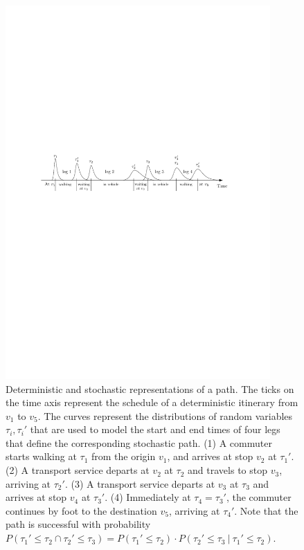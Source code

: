 \documentclass[dissertation,draft*]{aaltoseries}
\begin{document}
\begin{figure}[ht]
\begin{center}
\includegraphics[width=0.9\textwidth]{journey02}
\end{center}
\caption{Deterministic and stochastic representations of a path. The ticks on the time axis represent the 
schedule of a deterministic itinerary from $v_1$ to $v_5$. The curves represent the distributions 
of random variables $\tau_i, \tau_i'$ that are used to model the start and end times of four legs that 
define the corresponding stochastic path. 
(1) A commuter starts walking at $\tau_1$ from the origin $v_1$, and arrives at stop $v_2$ at $\tau_1'$. 
(2) A transport service departs at $v_2$ at $\tau_2$ and travels to stop $v_3$,
arriving at $\tau_2'$. (3) A transport service departs at $v_3$ at $\tau_3$ and arrives at stop $v_4$ at $\tau_3'$. 
(4) Immediately at $\tau_4=\tau_3'$, 
the commuter continues by foot to the destination $v_5$, arriving at $\tau_4'$. Note that the path is successful
with probability 
$P(\tau_1' \leq \tau_2 \cap \tau_2' \leq \tau_3) 
= P(\tau_1' \leq \tau_2) \cdot P (\tau_2' \leq \tau_3 \ | \ \tau_1' \leq \tau_2)$.
}
\label{journey01}
\end{figure}
\end{document}

